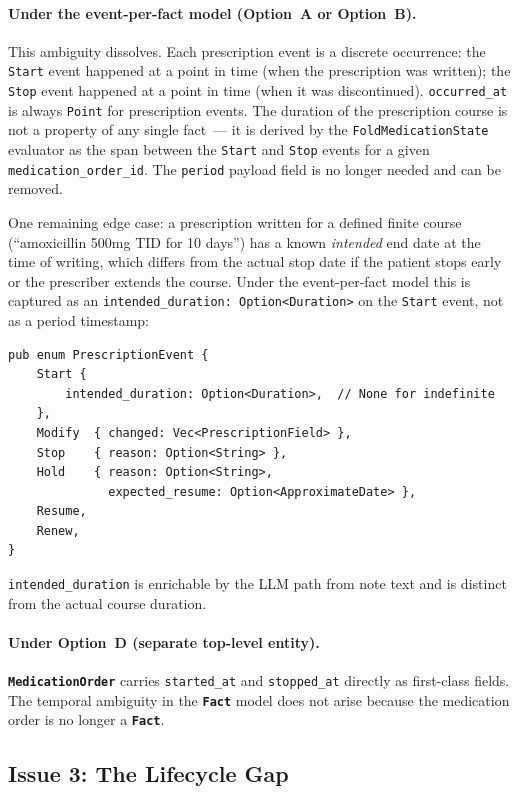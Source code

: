 \documentclass[11pt]{article}
\newcommand{\entity}[1]{\texttt{\textbf{#1}}}
\newcommand{\field}[1]{\texttt{#1}}
\begin{document}
\paragraph{Under the event-per-fact model (Option~A or Option~B).}
This ambiguity dissolves. Each prescription event is a discrete
occurrence: the \field{Start} event happened at a point in time (when
the prescription was written); the \field{Stop} event happened at a
point in time (when it was discontinued). \field{occurred\_at} is
always \field{Point} for prescription events. The duration of the
prescription course is not a property of any single fact~--- it is
derived by the \field{FoldMedicationState} evaluator as the span
between the \field{Start} and \field{Stop} events for a given
\field{medication\_order\_id}. The \field{period} payload field is no
longer needed and can be removed.

One remaining edge case: a prescription written for a defined finite
course (``amoxicillin 500mg TID for 10 days'') has a known
\emph{intended} end date at the time of writing, which differs from
the actual stop date if the patient stops early or the prescriber
extends the course. Under the event-per-fact model this is captured as
an \field{intended\_duration: Option<Duration>} on the \field{Start}
event, not as a period timestamp:

\begin{lstlisting}
pub enum PrescriptionEvent {
    Start {
        intended_duration: Option<Duration>,  // None for indefinite
    },
    Modify  { changed: Vec<PrescriptionField> },
    Stop    { reason: Option<String> },
    Hold    { reason: Option<String>,
              expected_resume: Option<ApproximateDate> },
    Resume,
    Renew,
}
\end{lstlisting}

\field{intended\_duration} is enrichable by the LLM path from note
text and is distinct from the actual course duration.

\paragraph{Under Option~D (separate top-level entity).}
\entity{MedicationOrder} carries \field{started\_at} and
\field{stopped\_at} directly as first-class fields. The temporal
ambiguity in the \entity{Fact} model does not arise because the
medication order is no longer a \entity{Fact}.

\subsection{Issue 3: The Lifecycle Gap}
\label{sec:lifecycle-gap}
\end{document}
